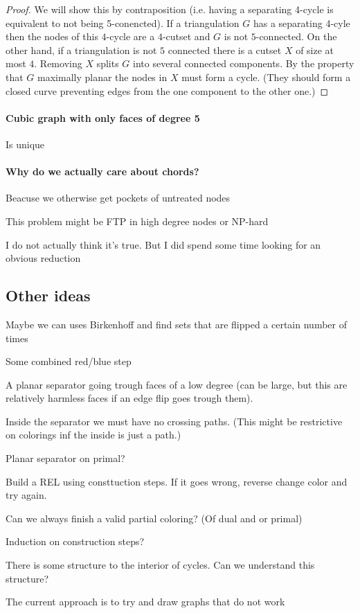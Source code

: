  \begin{proof}
  We will show this by contraposition (i.e. having a separating 4-cycle is equivalent to not being 5-conencted).
  If a triangulation $G$ has a separating 4-cyle then the nodes of this $4$-cycle are a $4$-cutset and $G$ is not $5$-connected.
  On the other hand, if a triangulation is not $5$ connected there is a cutset $X$ of size at most $4$. Removing $X$ splits $G$ into several connected components. By the property that $G$ maximally planar the nodes in $X$ must form a cycle. (They should form a closed curve preventing edges from the one component to the other one.)
  \end{proof}


  \paragraph{Cubic graph with only faces of degree 5}
  Is unique

  \paragraph{Why do we actually care about chords?}
  Beacuse we otherwise get pockets of untreated nodes

  \begin{con}
    This problem might be FTP in high degree nodes or NP-hard
  \end{con}
    I do not actually think it's true. But I did spend some time looking for an obvious reduction


    \subsection{Other ideas}
    Maybe we can uses Birkenhoff and find sets that are flipped a certain number of times

    Some combined red/blue step

    A planar separator going trough faces of a low degree (can be large, but this are relatively harmless faces if an edge flip goes trough them).

    Inside the separator we must have no crossing paths. (This might be restrictive on colorings inf the inside is just a path.)

    Planar separator on primal?


    Build a REL using consttuction steps. If it goes wrong, reverse change color and try again.

    Can we always finish a valid partial coloring? (Of dual and or primal)


    Induction on construction steps?

    There is some structure to the interior of cycles. Can we understand this structure?

    The current approach is to try and draw graphs that do not work

\printbibliography

